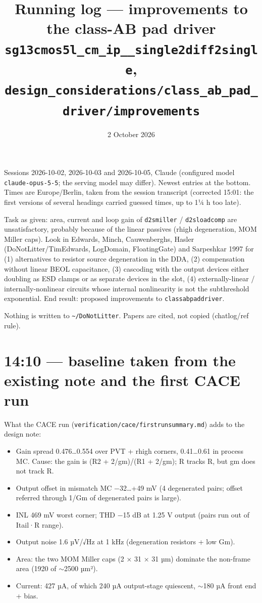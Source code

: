 \documentclass[11pt,a4paper]{article}
\title{Running log --- improvements to the class-AB pad driver\\[2pt]
  \large \texttt{sg13cmos5l\_cm\_ip\_\_single2diff2single}, \texttt{design\_considerations/class\_ab\_pad\_driver/improvements}}
\author{}
\date{2 October 2026}
\providecommand{\tightlist}{\setlength{\itemsep}{0pt}\setlength{\parskip}{0pt}}
\renewcommand{\_}{\textunderscore\hspace{0pt}}
\begin{document}
\maketitle
\small
Sessions 2026-10-02, 2026-10-03 and 2026-10-05,
Claude (configured model \texttt{claude-opus-5-5};
the serving model may differ). Newest entries at
the bottom. Times are Europe/Berlin, taken from
the session transcript (corrected 15:01: the first
versions of several headings carried guessed
times, up to 1¼ h too late).

Task as given: area, current and loop gain of
\texttt{d2s\_miller} / \texttt{d2s\_loadcomp} are
unsatisfactory, probably because of the linear
passives (rhigh degeneration, MOM Miller caps).
Look in Edwards, Minch, Cauwenberghs, Hasler
(DoNotLitter/TimEdwards, LogDomain, FloatingGate)
and Sarpeshkar 1997 for (1) alternatives to
resistor source degeneration in the DDA, (2)
compensation without linear BEOL capacitance, (3)
cascoding with the output devices either doubling
as ESD clamps or as separate devices in the slot,
(4) externally-linear / internally-nonlinear
circuits whose internal nonlinearity is not the
subthreshold exponential. End result: proposed
improvements to \texttt{class\_ab\_pad\_driver}.

Nothing is written to
\texttt{\textasciitilde{}/DoNotLitter}. Papers are
cited, not copied (chatlog/ref rule).

\hypertarget{1410--baseline-taken-from-the-existing-note-and-the-first-cace-run}{%
\section{14:10 --- baseline taken from the
existing note and the first CACE
run}\label{1410--baseline-taken-from-the-existing-note-and-the-first-cace-run}}

What the CACE run
(\texttt{verification/cace/first\_run\_summary.md})
adds to the design note:

\begin{itemize}
\tightlist
\item
  Gain spread 0.476\ldots0.554 over PVT + rhigh
  corners, 0.41\ldots0.61 in process MC. Cause:
  the gain is (R2 + 2/gm)/(R1 + 2/gm); R tracks R,
  but gm does not track R.
\item
  Output offset in mismatch MC −32\ldots+49 mV (4
  degenerated pairs; offset referred through 1/Gm
  of degenerated pairs is large).
\item
  INL 469 mV worst corner; THD −15 dB at 1.25 V
  output (pairs run out of I\_tail·R range).
\item
  Output noise 1.6 µV/√Hz at 1 kHz (degeneration
  resistors + low Gm).
\item
  Area: the two MOM Miller caps (2 × 31 × 31 µm)
  dominate the non-frame area (1920 of
  $\sim$2500 µm²).
\item
  Current: 427 µA, of which 240 µA output-stage
  quiescent, $\sim$180 µA front end +
  bias.
\end{itemize}
\end{document}
